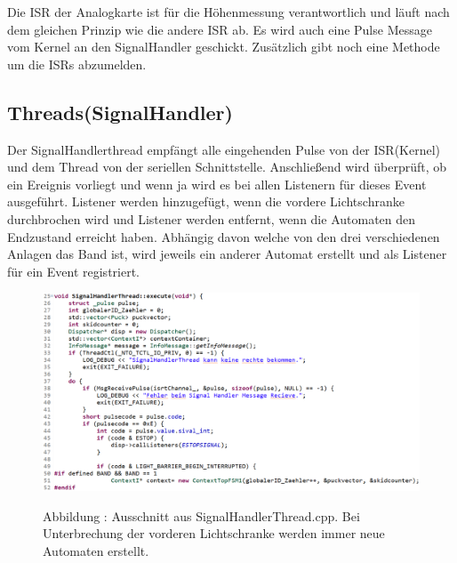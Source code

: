 \documentclass[a4paper, 11pt]{article}
\begin{document}
Die ISR der Analogkarte ist für die Höhenmessung verantwortlich und läuft nach dem gleichen Prinzip wie die andere ISR ab. Es wird auch eine Pulse Message vom Kernel an den SignalHandler geschickt. Zusätzlich gibt noch eine Methode um die ISRs abzumelden.

\newpage

\subsection{Threads(SignalHandler)}
Der SignalHandlerthread empfängt alle eingehenden Pulse von der ISR(Kernel) und dem Thread von der seriellen Schnittstelle. Anschließend wird überprüft, ob ein Ereignis vorliegt und wenn ja wird es bei allen Listenern für dieses Event ausgeführt. Listener werden hinzugefügt, wenn die vordere Lichtschranke durchbrochen wird und Listener werden entfernt, wenn die Automaten den Endzustand erreicht haben. Abhängig davon welche von den drei verschiedenen Anlagen das Band ist, wird jeweils ein anderer Automat erstellt und als Listener für ein Event registriert.

\begin{figure}[H]
\centering
    \includegraphics[scale=0.5]{ISR/sighandler.png}
    
    \small Abbildung \theimgcounter : Ausschnitt aus SignalHandlerThread.cpp. Bei Unterbrechung der vorderen Lichtschranke werden immer neue Automaten erstellt.
    \label{sighandler}
\end{figure}

\newpage
\end{document}
